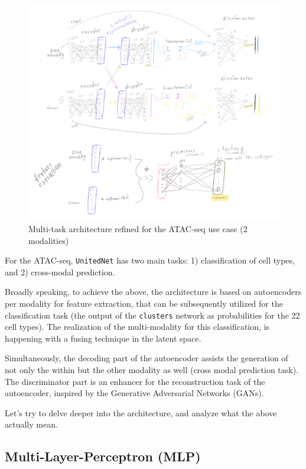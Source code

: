 \documentclass[12pt, a4paper]{article}
\begin{document}
\begin{figure}[h!]
  \centering
  \includegraphics[width=\textwidth]{architecture.png}
  \caption{Multi-task architecture refined for the ATAC-seq use case (2 modalities)}
  \label{fig:architecture}
\end{figure}

For the ATAC-seq, \verb|UnitedNet| has two main tasks: 1) classification of cell types, and 2) cross-modal prediction.

Broadly speaking, to achieve the above, the architecture is based on autoencoders per modality for feature extraction, that can be subsequently utilized for the classification task (the output of the \verb|clusters| network as probabilities for the 22 cell types). The realization of the multi-modality for this classification, is happening with a fusing technique in the latent space. 

Simultaneously, the decoding part of the autoencoder assists the generation of not only the within but the other modality as well (cross modal prediction task). The discriminator part is an enhancer for the reconstruction task of the autoencoder, inspired by the Generative Adversarial Networks (GANs). 


Let's try to delve deeper into the architecture, and analyze what the above actually mean.

\clearpage


\subsection{Multi-Layer-Perceptron (MLP)}
\label{sec:mlp}
\end{document}
